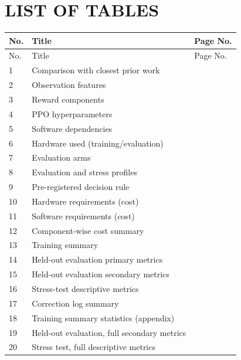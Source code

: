 \chapter*{\centering LIST OF TABLES}
\label{ch:lot}

\begin{center}
\small
\renewcommand{\arraystretch}{0.92}
\begin{longtable}{p{1.0cm}p{10.5cm}p{2.0cm}}
\toprule
No. & Title & Page No. \\
\midrule
\endfirsthead
\toprule
No. & Title & Page No. \\
\midrule
\endhead
1 & Comparison with closest prior work & \pageref{tab:related-work-summary} \\
2 & Observation features & \pageref{tab:observation-features} \\
3 & Reward components & \pageref{tab:reward-components} \\
4 & PPO hyperparameters & \pageref{tab:ppo-hyperparams} \\
5 & Software dependencies & \pageref{tab:software-stack} \\
6 & Hardware used (training/evaluation) & \pageref{tab:hardware} \\
7 & Evaluation arms & \pageref{tab:eval-arms} \\
8 & Evaluation and stress profiles & \pageref{tab:eval-profiles} \\
9 & Pre-registered decision rule & \pageref{tab:decision-rule} \\
10 & Hardware requirements (cost) & \pageref{tab:cost-hardware} \\
11 & Software requirements (cost) & \pageref{tab:cost-software} \\
12 & Component-wise cost summary & \pageref{tab:cost-total} \\
13 & Training summary & \pageref{tab:training-summary} \\
14 & Held-out evaluation primary metrics & \pageref{tab:eval-primary} \\
15 & Held-out evaluation secondary metrics & \pageref{tab:eval-secondary-main} \\
16 & Stress-test descriptive metrics & \pageref{tab:stress-descriptive-main} \\
17 & Correction log summary & \pageref{tab:corr-summary} \\
18 & Training summary statistics (appendix) & \pageref{tab:training-summary-appendix} \\
19 & Held-out evaluation, full secondary metrics & \pageref{tab:eval-secondary-appendix} \\
20 & Stress test, full descriptive metrics & \pageref{tab:stress-descriptive-appendix} \\
\bottomrule
\end{longtable}
\end{center}
